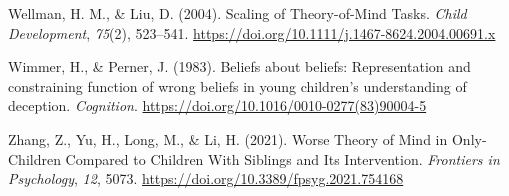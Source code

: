 \documentclass[
  man,floatsintext]{apa7}
\newlength{\cslhangindent}
\newlength{\cslentryspacingunit} %
\newenvironment{CSLReferences}[2] %
 {%
  \setlength{\parindent}{0pt}
  \ifodd #1
  \let\oldpar\par
  \def\par{\hangindent=\cslhangindent\oldpar}
  \fi
  \setlength{\parskip}{#2\cslentryspacingunit}
 }%
 {}
\begin{document}
\begin{CSLReferences}{1}{0}
\leavevmode{}%
Wellman, H. M., \& Liu, D. (2004). Scaling of {Theory-of-Mind Tasks}. \emph{Child Development}, \emph{75}(2), 523--541. \url{https://doi.org/10.1111/j.1467-8624.2004.00691.x}

\leavevmode{}%
Wimmer, H., \& Perner, J. (1983). Beliefs about beliefs: {Representation} and constraining function of wrong beliefs in young children's understanding of deception. \emph{Cognition}. \url{https://doi.org/10.1016/0010-0277(83)90004-5}

\leavevmode{}%
Zhang, Z., Yu, H., Long, M., \& Li, H. (2021). Worse {Theory} of {Mind} in {Only-Children Compared} to {Children With Siblings} and {Its Intervention}. \emph{Frontiers in Psychology}, \emph{12}, 5073. \url{https://doi.org/10.3389/fpsyg.2021.754168}

\end{CSLReferences}

\endgroup
\end{document}
